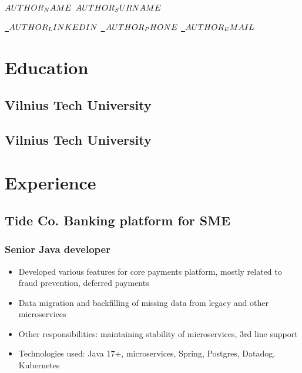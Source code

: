 \documentclass[11pt]{article}
\begin{document}


\begin{center}
  {\Huge\bfseries $AUTHOR_NAME$ $AUTHOR_SURNAME$} \\ \medskip

  \href{$\authorlinkedin}{\faLinkedin~$AUTHOR_LINKEDIN$} \quad
  \href{tel:$\authorphone$}{\faPhone~$AUTHOR_PHONE$} \quad
  \href{mailto:$\authoremail$}{\faEnvelope~$AUTHOR_EMAIL$} \quad
\end{center}

\section{Education}
\subsection{Vilnius Tech University  }
\subsection{Vilnius Tech University  }


\section{Experience}

\subsection{Tide Co. Banking platform for SME}
\subsubsection{Senior Java developer }
\begin{itemize}
\item Developed various features for core payments platform, mostly related to fraud prevention, deferred payments
\item Data migration and backfilling of missing data from legacy and other microservices
\item Other responsibilities: maintaining stability of microservices, 3rd line support
\item Technologies used: Java 17+, microservices, Spring, Postgres, Datadog, Kubernetes
\end{itemize}
\end{document}
